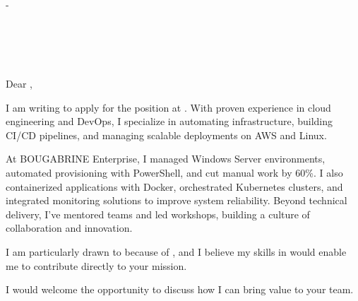 \documentclass[11pt,a4paper]{article}
\begin{document}
\begin{flushright}
    {\textbf{\FullName}} - \JobTitle \\
    \Phone \\
    \href{mailto:\Email}{\Email} \\
    \Location \\
    \LinkedIn \\
    \GitHub
\end{flushright}


Dear \HiringManager,

I am writing to apply for the \JobTitle position at \CompanyName. With proven experience in cloud engineering and DevOps, I specialize in automating infrastructure, building CI/CD pipelines, and managing scalable deployments on AWS and Linux.

At BOUGABRINE Enterprise, I managed Windows Server environments, automated provisioning with PowerShell, and cut manual work by 60\%. I also containerized applications with Docker, orchestrated Kubernetes clusters, and integrated monitoring solutions to improve system reliability. Beyond technical delivery, I’ve mentored teams and led workshops, building a culture of collaboration and innovation.

I am particularly drawn to \CompanyName because of \YourMotivation, and I believe my skills in \JobKeywords would enable me to contribute directly to your mission.

I would welcome the opportunity to discuss how I can bring value to your team.

\Signature
\end{document}
